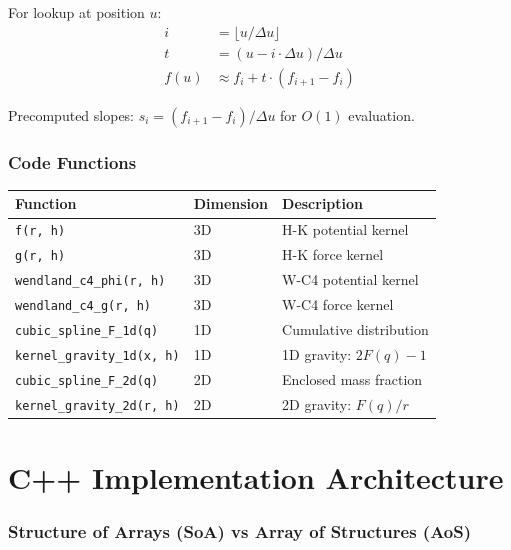 \documentclass[12pt]{article}
\begin{document}
For lookup at position $u$:
\begin{align}
i &= \lfloor u / \Delta u \rfloor \\
t &= (u - i \cdot \Delta u) / \Delta u \\
f(u) &\approx f_i + t \cdot (f_{i+1} - f_i)
\end{align}

Precomputed slopes: $s_i = (f_{i+1} - f_i) / \Delta u$ for $O(1)$ evaluation.

\section{Code Functions}

\begin{table}[h]
\centering
\begin{tabular}{lll}
\toprule
\textbf{Function} & \textbf{Dimension} & \textbf{Description} \\
\midrule
\texttt{f(r, h)} & 3D & H-K potential kernel \\
\texttt{g(r, h)} & 3D & H-K force kernel \\
\texttt{wendland\_c4\_phi(r, h)} & 3D & W-C4 potential kernel \\
\texttt{wendland\_c4\_g(r, h)} & 3D & W-C4 force kernel \\
\texttt{cubic\_spline\_F\_1d(q)} & 1D & Cumulative distribution \\
\texttt{kernel\_gravity\_1d(x, h)} & 1D & 1D gravity: $2F(q)-1$ \\
\texttt{cubic\_spline\_F\_2d(q)} & 2D & Enclosed mass fraction \\
\texttt{kernel\_gravity\_2d(r, h)} & 2D & 2D gravity: $F(q)/r$ \\
\bottomrule
\end{tabular}
\end{table}

\part{C++ Implementation Architecture}

\section{Structure of Arrays (SoA) vs Array of Structures (AoS)}
\end{document}
